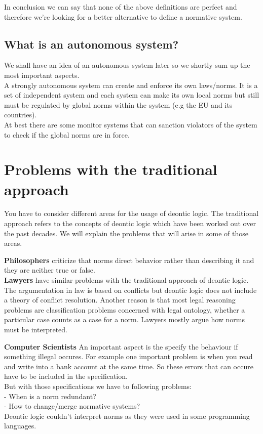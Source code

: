 \documentclass[conference]{IEEE}
\begin{document}
In conclusion we can say that none of the above definitions are perfect and therefore we're looking for a better alternative to define a normative system.

\subsection{What is an autonomous system?}
We shall have an idea of an autonomous system later so we shortly sum up the most important aspects.\\

A strongly autonomous system can create and enforce its own laws/norms. It is a set of independent system and each system can make its own local norms but still must be regulated by global norms within the system (e.g the EU and its countries).\\
At best there are some monitor systems that can sanction violators of the system to check if the global norms are in force.\\


\section{Problems with the traditional approach}
You have to consider different areas for the usage of deontic logic. The traditional approach refers to the concepts of deontic logic which have been worked out over the past decades.  We will explain the problems that will arise in some of those areas.

\textbf{Philosophers} criticize that norms direct behavior rather than describing it and they are neither true or false. \\

\textbf{Lawyers} have similar problems with the traditional approach of deontic logic. The argumentation in law is based on conflicts but deontic logic does not include a theory of conflict resolution. Another reason is that most legal reasoning problems are classification problems concerned with legal ontology, whether a particular case counts as a case for a norm. Lawyers mostly argue how norms must be interpreted. \cite{b2}

\textbf{Computer Scientists}
An important aspect is the specify the behaviour if something illegal occures. For example one important problem is when you read and write into a bank account at the same time. So these errors that can occure have to be included in the specification.\\
But with those specifications we have to following problems:\\
- When is a norm redundant?\\
- How to change/merge normative systems?\\
Deontic logic couldn't interpret norms as they were used in some programming languages.\\
\end{document}
